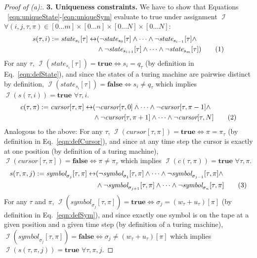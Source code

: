 \documentclass [11pt]{article}
\newcommand{\sym}[3]{\textit{symbol}_{#1}[#2,#3]}
\newcommand{\cursor}[2]{\textit{cursor}[#1,#2]}
\newcommand{\state}[2]{\textit{state}_{#1}[#2]}
\newcommand{\pt}{\ensuremath{\pi_{\tau}}}
\newcommand{\qt}{\ensuremath{q_{\tau}}}
\newcommand{\wt}{\ensuremath{w_{\tau}}}
\newcommand{\ut}{\ensuremath{u_{\tau}}}
\DeclareMathOperator{\II}{\mathcal{I}}
\newcommand{\True}{\mathbf{true}}
\newcommand{\False}{\mathbf{false}}
\newcommand\numberthis{\addtocounter{equation}{1}\tag{\theequation}}
\newcommand\neqn[1]{\numberthis\label{eqn:#1}}
\begin{document}
\begin{proof}[Proof of (a):]
\smallskip
\noindent
{\bf 3. Uniqueness constraints.} 
We have to show that Equations ~\ref{eqn:uniqueState}-\ref{eqn:uniqueSym} evaluate to true under assignment $\II$ $\forall (i, j, \tau, \pi) \in [0\dots m]\times[0\dots n]\times[0\dots N]\times[0\dots N]$:
\begin{align*}
s(\tau, i) := \state{s_i}{\tau} \leftrightarrow &(\neg \state{s_0}{\tau} \wedge \dots \wedge \neg \state{s_{i-1}}{\tau} \wedge \\
&\wedge \neg \state{s_{i+1}}{\tau} \wedge \dots \wedge \neg \state{s_{m}}{\tau}) \neqn{uniqueState}
\end{align*}
For any $\tau$, $\II(\state{s_i}{\tau}) = \True \iff s_i = \qt$ (by definition in Eq.~\ref{eqn:defState}), and since the states of a turing machine are pairwise distinct by definition, $\II(\state{s_i}{\tau}) = \False \iff s_i \neq \qt$ which implies $\II(s(\tau, i)) = \True$ $\forall \tau, i$.     
\begin{align*}
c(\tau, \pi) := \cursor{\tau}{\pi} \leftrightarrow & (\neg \cursor{\tau}{0} \wedge \dots \wedge \neg \cursor{\tau}{\pi - 1} \wedge \\
&\wedge \neg \cursor{\tau}{\pi+1} \wedge \dots \wedge \neg \cursor{\tau}{N}
 \neqn{uniqueCursor}
\end{align*}
Analogous to the above: For any $\tau$, $\II(\cursor{\tau}{\pi}) = \True \iff \pi = \pt$ (by definition in Eq.~\ref{eqn:defCursor}), and since at any time step the cursor is exactly at one position (by definition of a turing machine), $\II(\cursor{\tau}{\pi}) = \False \iff \pi \neq \pt$ which implies $\II(c(\tau, \pi)) = \True$ $\forall \tau, \pi$.  
\begin{align*}
s(\tau, \pi, j) := \sym{\sigma_j}{\tau}{\pi} \leftrightarrow & (\neg \sym{\sigma_1}{\tau}{\pi} \wedge \dots \wedge \neg \sym{\sigma_{j-1}}{\tau}{\pi} \wedge \\
& \wedge \neg \sym{\sigma_{j+1}}{\tau}{\pi} \wedge \dots \wedge \neg \sym{\sigma_{n}}{\tau}{\pi}
 \neqn{uniqueSym}
\end{align*}
For any $\tau$ and $\pi$, $\II(\sym{\sigma_j}{\tau}{\pi}) = \True \iff \sigma_j = (\wt+\ut)[\pi]$ (by definition in Eq.~\ref{eqn:defSym}), and since exactly one symbol is on the tape at a given position and a given time step (by definition of a turing machine), $\II(\sym{\sigma_j}{\tau}{\pi}) = \False \iff \sigma_j \neq (\wt+\ut)[\pi]$ which implies $\II(s(\tau, \pi, j)) = \True$ $\forall \tau, \pi, j$.  


\end{proof}
\end{document}
